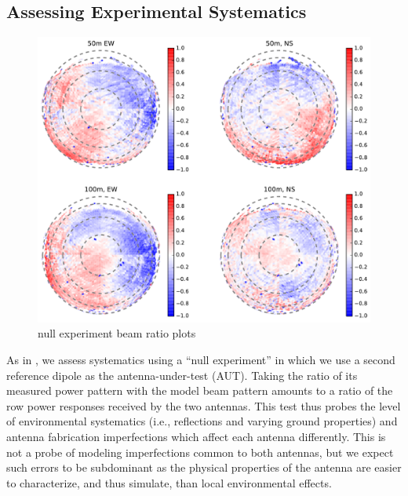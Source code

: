 \documentclass{emulateapj}
\begin{document}

\subsection{Assessing Experimental Systematics}


\begin{figure}[h]
\centering
\includegraphics[width=6.7in]{null_expt_rel_beam_maps.pdf}
\caption{null experiment beam ratio plots}
\label{fig:nullexptplots}
\end{figure}

As in \citet{neben15}, we assess systematics using a ``null experiment'' in which we use a second reference dipole as the antenna-under-test (AUT). Taking the ratio of its measured power pattern with the model beam pattern amounts to a ratio of the row power responses received by the two antennas. This test thus probes the level of environmental systematics (i.e., reflections and varying ground properties) and antenna fabrication imperfections which affect each antenna differently. This is not a probe of modeling imperfections common to both antennas, but we expect such errors to be subdominant as the physical properties of the antenna are easier to characterize, and thus simulate, than local environmental effects. 
\end{document}
